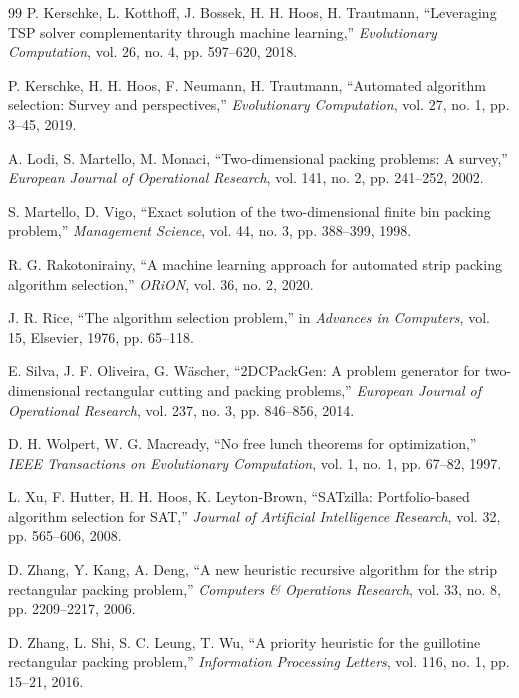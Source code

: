\documentclass[11pt,a4paper]{article}
\begin{document}
\begin{thebibliography}{99}
P. Kerschke, L. Kotthoff, J. Bossek, H. H. Hoos, H. Trautmann, ``Leveraging TSP solver complementarity through machine learning,'' \textit{Evolutionary Computation}, vol. 26, no. 4, pp. 597--620, 2018.

P. Kerschke, H. H. Hoos, F. Neumann, H. Trautmann, ``Automated algorithm selection: Survey and perspectives,'' \textit{Evolutionary Computation}, vol. 27, no. 1, pp. 3--45, 2019.

A. Lodi, S. Martello, M. Monaci, ``Two-dimensional packing problems: A survey,'' \textit{European Journal of Operational Research}, vol. 141, no. 2, pp. 241--252, 2002.

S. Martello, D. Vigo, ``Exact solution of the two-dimensional finite bin packing problem,'' \textit{Management Science}, vol. 44, no. 3, pp. 388--399, 1998.

R. G. Rakotonirainy, ``A machine learning approach for automated strip packing algorithm selection,'' \textit{ORiON}, vol. 36, no. 2, 2020.

J. R. Rice, ``The algorithm selection problem,'' in \textit{Advances in Computers}, vol. 15, Elsevier, 1976, pp. 65--118.

E. Silva, J. F. Oliveira, G. W\"{a}scher, ``2DCPackGen: A problem generator for two-dimensional rectangular cutting and packing problems,'' \textit{European Journal of Operational Research}, vol. 237, no. 3, pp. 846--856, 2014.

D. H. Wolpert, W. G. Macready, ``No free lunch theorems for optimization,'' \textit{IEEE Transactions on Evolutionary Computation}, vol. 1, no. 1, pp. 67--82, 1997.

L. Xu, F. Hutter, H. H. Hoos, K. Leyton-Brown, ``SATzilla: Portfolio-based algorithm selection for SAT,'' \textit{Journal of Artificial Intelligence Research}, vol. 32, pp. 565--606, 2008.

D. Zhang, Y. Kang, A. Deng, ``A new heuristic recursive algorithm for the strip rectangular packing problem,'' \textit{Computers \& Operations Research}, vol. 33, no. 8, pp. 2209--2217, 2006.

D. Zhang, L. Shi, S. C. Leung, T. Wu, ``A priority heuristic for the guillotine rectangular packing problem,'' \textit{Information Processing Letters}, vol. 116, no. 1, pp. 15--21, 2016.

\end{thebibliography}
\end{document}
